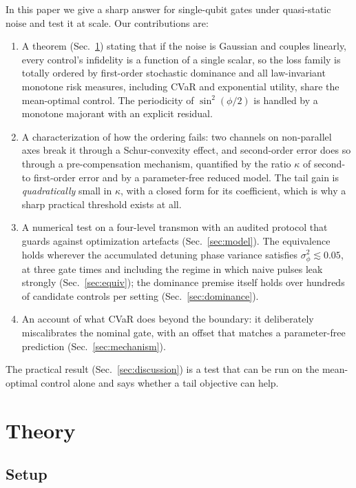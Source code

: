 \documentclass[aps,pra,twocolumn,superscriptaddress,reprint,nofootinbib,floatfix]{revtex4-2}
\theoremstyle{definition}
\begin{document}
In this paper we give a sharp answer for single-qubit gates under
quasi-static noise and test it at scale. Our contributions are:
\begin{enumerate}
\item A theorem (Sec.~\ref{sec:theory}) stating that if the noise is Gaussian
and couples linearly, every control's infidelity is a function of a single
scalar, so the loss family is totally ordered by first-order stochastic
dominance and all law-invariant monotone risk measures, including CVaR and
exponential utility, share the mean-optimal control. The periodicity of
$\sin^2(\phi/2)$ is handled by a monotone majorant with an explicit residual.
\item A characterization of how the ordering fails: two channels on
non-parallel axes break it through a Schur-convexity effect, and second-order
error does so through a pre-compensation mechanism, quantified by the ratio
$\kappa$ of second- to first-order error and by a parameter-free reduced
model. The tail gain is \emph{quadratically} small in $\kappa$, with a closed
form for its coefficient, which is why a sharp practical threshold exists at
all.
\item A numerical test on a four-level transmon with an audited protocol that
guards against optimization artefacts (Sec.~\ref{sec:model}). The equivalence
holds wherever the accumulated detuning phase variance satisfies
$\sigma_\phi^2\lesssim0.05$, at three gate times and including the regime in
which naive pulses leak strongly (Sec.~\ref{sec:equiv}); the dominance premise
itself holds over hundreds of candidate controls per setting
(Sec.~\ref{sec:dominance}).
\item An account of what CVaR does beyond the boundary: it deliberately
miscalibrates the nominal gate, with an offset that matches a parameter-free
prediction (Sec.~\ref{sec:mechanism}).
\end{enumerate}
The practical result (Sec.~\ref{sec:discussion}) is a test that can be run
on the mean-optimal control alone and says whether a tail objective can
help.

\section{Theory}
\label{sec:theory}

\subsection{Setup}
\end{document}
